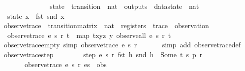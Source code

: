 \begin{isabellebody}
\ \ \ \ \ \ {\isacharunderscore}\ {\isasymRightarrow}\ {\isacharbrackleft}{\isacharbrackright}\isanewline
\ \ \ \ {\isacharparenright}{\isachardoublequoteclose}\isanewline
\isanewline
{}\isamarkupfalse%
\ state\ {\isacharcolon}{\isacharcolon}\ {\isachardoublequoteopen}{\isacharparenleft}transition\ {\isasymtimes}\ nat\ {\isasymtimes}\ outputs\ {\isasymtimes}\ datastate{\isacharparenright}\ {\isasymRightarrow}\ nat{\isachardoublequoteclose}\ \isanewline
\ \ {\isachardoublequoteopen}state\ x\ {\isasymequiv}\ fst\ {\isacharparenleft}snd\ x{\isacharparenright}{\isachardoublequoteclose}\isanewline
\isanewline
{}\isamarkupfalse%
\ observe{\isacharunderscore}trace\ {\isacharcolon}{\isacharcolon}\ {\isachardoublequoteopen}transition{\isacharunderscore}matrix\ {\isasymRightarrow}\ nat\ {\isasymRightarrow}\ registers\ {\isasymRightarrow}\ trace\ {\isasymRightarrow}\ observation{\isachardoublequoteclose}\ \isanewline
\ \ {\isachardoublequoteopen}observe{\isacharunderscore}trace\ e\ s\ r\ t\ {\isasymequiv}\ map\ {\isacharparenleft}{\isasymlambda}{\isacharparenleft}t{\isacharcomma}x{\isacharcomma}y{\isacharcomma}z{\isacharparenright}{\isachardot}\ y{\isacharparenright}\ {\isacharparenleft}observe{\isacharunderscore}all\ e\ s\ r\ t{\isacharparenright}{\isachardoublequoteclose}\isanewline
\isanewline
{}\isamarkupfalse%
\ observe{\isacharunderscore}trace{\isacharunderscore}empty\ {\isacharbrackleft}simp{\isacharbrackright}{\isacharcolon}\ {\isachardoublequoteopen}observe{\isacharunderscore}trace\ e\ s\ r\ {\isacharbrackleft}{\isacharbrackright}\ {\isacharequal}\ {\isacharbrackleft}{\isacharbrackright}{\isachardoublequoteclose}\isanewline
%
\isadelimproof
\ \ %
\endisadelimproof
%
\isatagproof
{}\isamarkupfalse%
\ {\isacharparenleft}simp\ add{\isacharcolon}\ observe{\isacharunderscore}trace{\isacharunderscore}def{\isacharparenright}%
\endisatagproof
{\isafoldproof}%
%
\isadelimproof
\isanewline
%
\endisadelimproof
\isanewline
{}\isamarkupfalse%
\ observe{\isacharunderscore}trace{\isacharunderscore}step{\isacharcolon}\ {\isachardoublequoteopen}\isanewline
\ \ \ \ \ \ \ step\ e\ s\ r\ {\isacharparenleft}fst\ h{\isacharparenright}\ {\isacharparenleft}snd\ h{\isacharparenright}\ {\isacharequal}\ Some\ {\isacharparenleft}t{\isacharcomma}\ s{\isacharprime}{\isacharcomma}\ p{\isacharcomma}\ r{\isacharprime}{\isacharparenright}\ {\isasymLongrightarrow}\isanewline
\ \ \ \ \ \ \ observe{\isacharunderscore}trace\ e\ s{\isacharprime}\ r{\isacharprime}\ es\ {\isacharequal}\ obs\ {\isasymLongrightarrow}\isanewline

\end{isabellebody}
